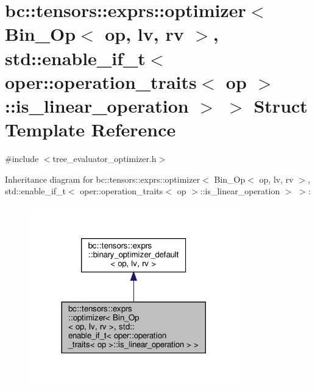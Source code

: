 \hypertarget{structbc_1_1tensors_1_1exprs_1_1optimizer_3_01Bin__Op_3_01op_00_01lv_00_01rv_01_4_00_01std_1_1en0dcf27d7e2238f62469eab81d847c552}{}\section{bc\+:\+:tensors\+:\+:exprs\+:\+:optimizer$<$ Bin\+\_\+\+Op$<$ op, lv, rv $>$, std\+:\+:enable\+\_\+if\+\_\+t$<$ oper\+:\+:operation\+\_\+traits$<$ op $>$\+:\+:is\+\_\+linear\+\_\+operation $>$ $>$ Struct Template Reference}
\label{structbc_1_1tensors_1_1exprs_1_1optimizer_3_01Bin__Op_3_01op_00_01lv_00_01rv_01_4_00_01std_1_1en0dcf27d7e2238f62469eab81d847c552}


{\ttfamily \#include $<$tree\+\_\+evaluator\+\_\+optimizer.\+h$>$}



Inheritance diagram for bc\+:\+:tensors\+:\+:exprs\+:\+:optimizer$<$ Bin\+\_\+\+Op$<$ op, lv, rv $>$, std\+:\+:enable\+\_\+if\+\_\+t$<$ oper\+:\+:operation\+\_\+traits$<$ op $>$\+:\+:is\+\_\+linear\+\_\+operation $>$ $>$\+:\nopagebreak
\begin{figure}[H]
\begin{center}
\leavevmode
\includegraphics[width=257pt]{structbc_1_1tensors_1_1exprs_1_1optimizer_3_01Bin__Op_3_01op_00_01lv_00_01rv_01_4_00_01std_1_1en14e39742730d7086f1051032fc1fcacf}
\end{center}
\end{figure}


